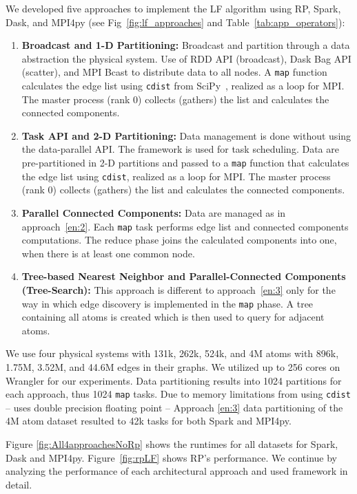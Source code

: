 We developed five approaches to implement the LF algorithm using RP,
Spark, Dask, and MPI4py (see Fig~\ref{fig:lf_approaches} and
Table~\ref{tab:app_operators}):
\begin{enumerate}[1)]
    \item \textbf{Broadcast and 1-D Partitioning:} Broadcast and partition 
    through a data abstraction the physical system. Use of RDD API
    (broadcast), Dask Bag API (scatter), and MPI Bcast to distribute data to all
    nodes. A \texttt{map} function calculates the edge list using \texttt{cdist}
    from SciPy~\cite{scipy}, realized as a loop for MPI. The master process (rank 0)
    collects (gathers) the list and calculates the connected components.\label{en:1}
    \item \textbf{Task API and 2-D Partitioning:} Data management is done
    without using the data-parallel API. The framework is used for task
    scheduling. Data are pre-partitioned in 2-D partitions and passed to a
    \texttt{map} function that calculates the edge list using \texttt{cdist},
    realized as a loop for MPI.  The master process (rank 0)
    collects (gathers) the list and calculates the connected components.\label{en:2}
    \item \textbf{Parallel Connected Components:} Data are managed as in
    approach~\ref{en:2}. Each \texttt{map} task performs edge list and connected
    components computations. The reduce phase joins the calculated components
    into one, when there is at least one common node.\label{en:3}
    \item \textbf{Tree-based Nearest Neighbor and Parallel-Connected Components
    (Tree-Search):} This approach is different to approach~\ref{en:3} only for
    the way in which edge discovery is implemented in the \texttt{map} phase. A
    tree containing all atoms is created which is then used to query for
    adjacent atoms.\label{en:4}
\end{enumerate}

We use four physical systems with 131k, 262k, 524k, and 4M atoms with
896k, 1.75M, 3.52M, and 44.6M edges in their graphs. We utilized up to
256 cores on Wrangler for our experiments. Data partitioning results into 1024
partitions for each approach, thus 1024 \texttt{map} tasks. Due to memory
limitations from using \texttt{cdist} -- uses double precision floating point --
Approach \ref{en:3} data partitioning of the 4M atom dataset resulted to 42k
tasks for both Spark and MPI4py.

Figure \ref{fig:All4approachesNoRp} shows the runtimes for all datasets for
Spark, Dask and MPI4py. Figure~\ref{fig:rpLF} shows RP's performance.
 We continue by analyzing the performance of each
architectural approach and used framework in detail.

